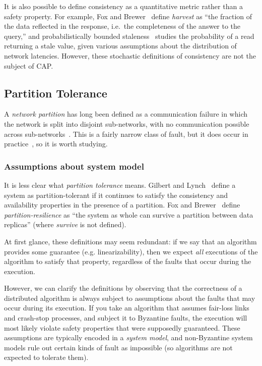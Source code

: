 \documentclass[a4paper,twocolumn,10pt]{article}
\begin{document}
It is also possible to define consistency as a quantitative metric rather than a safety property.
For example, Fox and Brewer~\cite{Fox1999bs} define \emph{harvest} as ``the fraction of the data
reflected in the response, i.e.\ the completeness of the answer to the query,'' and
probabilistically bounded staleness~\cite{Bailis2012to} studies the probability of a read returning
a stale value, given various assumptions about the distribution of network latencies. However, these
stochastic definitions of consistency are not the subject of CAP.

\subsection{Partition Tolerance}\label{sec:partitions}

A \emph{network partition} has long been defined as a communication failure in which the network is
split into disjoint sub-networks, with no communication possible across
sub-networks~\cite{Johnson1975we}. This is a fairly narrow class of fault, but it does occur in
practice~\cite{Bailis2014jx}, so it is worth studying.

\subsubsection{Assumptions about system model}

It is less clear what \emph{partition tolerance} means. Gilbert and Lynch~\cite{Gilbert2002il}
define a system as partition-tolerant if it continues to satisfy the consistency and availability
properties in the presence of a partition. Fox and Brewer~\cite{Fox1999bs} define
\emph{partition-resilience} as ``the system as whole can survive a partition between data replicas''
(where \emph{survive} is not defined).

At first glance, these definitions may seem redundant: if we say that an algorithm provides some
guarantee (e.g. linearizability), then we expect \emph{all} executions of the algorithm to satisfy
that property, regardless of the faults that occur during the execution.

However, we can clarify the definitions by observing that the correctness of a distributed algorithm
is always subject to assumptions about the faults that may occur during its execution. If you take
an algorithm that assumes fair-loss links and crash-stop processes, and subject it to Byzantine
faults, the execution will most likely violate safety properties that were supposedly guaranteed.
These assumptions are typically encoded in a \emph{system model}, and non-Byzantine system models
rule out certain kinds of fault as impossible (so algorithms are not expected to tolerate them).
\end{document}
